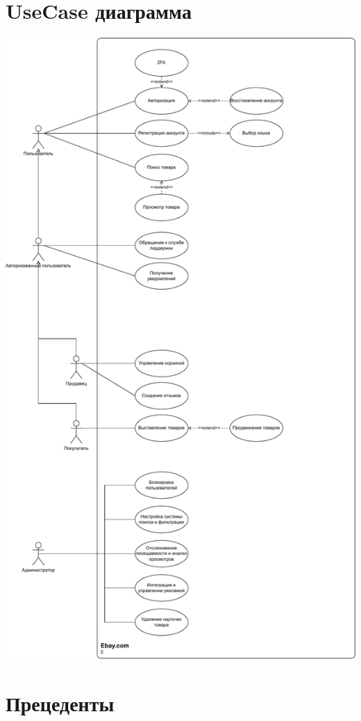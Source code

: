 \documentclass{article}
\begin{document}
\section{UseCase диаграмма}

\begin{center}
    \includegraphics[scale=0.55]{UseCase.drawio.pdf}
\end{center}

\section{Прецеденты}
\end{document}
